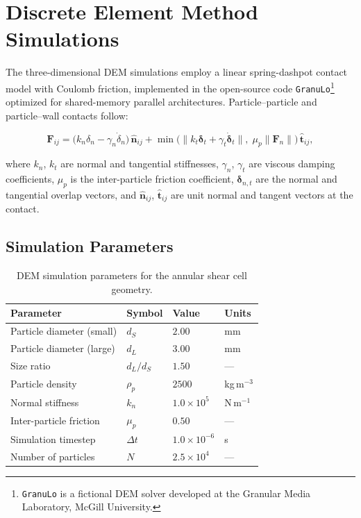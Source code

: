 \section{Discrete Element Method Simulations}

The three-dimensional DEM simulations employ a linear spring-dashpot contact model with Coulomb friction, implemented in the open-source code \texttt{GranuLo}\footnote{\texttt{GranuLo} is a fictional DEM solver developed at the Granular Media Laboratory, McGill University.} optimized for shared-memory parallel architectures. Particle–particle and particle–wall contacts follow:

\begin{equation}
\mathbf{F}_{ij} = \bigl(k_n \delta_n - \gamma_n \dot{\delta}_n\bigr)\,\hat{\mathbf{n}}_{ij}
                  + \min\bigl(\|k_t \boldsymbol{\delta}_t + \gamma_t \dot{\boldsymbol{\delta}}_t\|,\;
                            \mu_p \|\mathbf{F}_n\|\bigr)\,\hat{\mathbf{t}}_{ij},
\end{equation}

where $k_n$, $k_t$ are normal and tangential stiffnesses, $\gamma_n$, $\gamma_t$ are viscous damping coefficients, $\mu_p$ is the inter-particle friction coefficient, $\boldsymbol{\delta}_{n,t}$ are the normal and tangential overlap vectors, and $\hat{\mathbf{n}}_{ij}$, $\hat{\mathbf{t}}_{ij}$ are unit normal and tangent vectors at the contact.

\subsection*{Simulation Parameters}

\begin{table}[htbp]
\centering
\caption{DEM simulation parameters for the annular shear cell geometry.}
\begin{tabularx}{0.82\textwidth}{lXXX}
\toprule
Parameter & Symbol & Value & Units \\
\midrule
Particle diameter (small)  & $d_S$   & $2.00$ & mm \\
Particle diameter (large)  & $d_L$   & $3.00$ & mm \\
Size ratio                 & $d_L/d_S$ & $1.50$ & --- \\
Particle density           & $\rho_p$ & $2500$ & kg\,m$^{-3}$ \\
Normal stiffness           & $k_n$   & $1.0 \times 10^5$ & N\,m$^{-1}$ \\
Inter-particle friction    & $\mu_p$ & $0.50$ & --- \\
Simulation timestep        & $\Delta t$ & $1.0 \times 10^{-6}$ & s \\
Number of particles        & $N$     & $2.5 \times 10^4$ & --- \\
\bottomrule
\end{tabularx}
\end{table}
